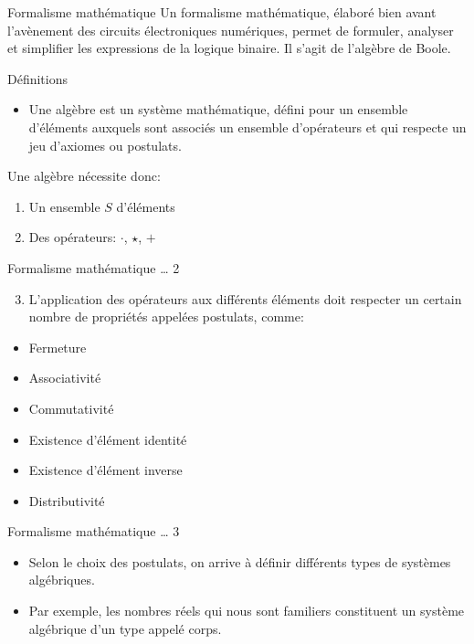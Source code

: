 \documentclass[presentation]{beamer}
\begin{document}
\begin{frame}[label={sec:org629db48}]{Formalisme mathématique}
Un formalisme mathématique, élaboré bien avant l'avènement des circuits électroniques numériques, permet de formuler, analyser et simplifier les expressions de la logique binaire. Il s'agit de l'algèbre de Boole.

\begin{block}{Définitions}
\begin{itemize}
\item Une algèbre est un système mathématique, défini pour un ensemble d'éléments auxquels sont associés un ensemble d'opérateurs et qui respecte un jeu d'axiomes ou postulats.
\end{itemize}

Une algèbre nécessite donc:

\begin{enumerate}
\item Un ensemble \(S\) d'éléments

\item Des opérateurs: \(\cdot\), \(\star\), \(+\)
\end{enumerate}
\end{block}
\end{frame}

\begin{frame}[label={sec:org5d6b079}]{Formalisme mathématique \ldots{} 2}
\begin{enumerate}
\setcounter{enumi}{2}
\item L'application des opérateurs aux différents éléments doit respecter un certain nombre de propriétés appelées postulats, comme:
\end{enumerate}
\begin{itemize}
\item Fermeture

\item Associativité

\item Commutativité

\item Existence d'élément identité

\item Existence d'élément inverse

\item Distributivité
\end{itemize}
\end{frame}

\begin{frame}[label={sec:org00d9a20}]{Formalisme mathématique \ldots{} 3}
\begin{itemize}
\item Selon le choix des postulats, on arrive à définir différents types de systèmes algébriques.

\item Par exemple, les nombres réels qui nous sont familiers constituent un système algébrique d'un type appelé \alert{corps}.
\end{itemize}
\end{frame}
\end{document}
